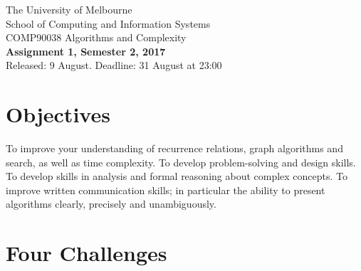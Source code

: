 \documentclass[11pt]{article}
\begin{document}
\begin{center}
{\sc The University of Melbourne
\\
School of Computing and Information Systems
\\ 
COMP90038 Algorithms and Complexity}
\bigskip \\
{\Large\bf Assignment 1, Semester 2, 2017}
\bigskip \\
{\large Released: 9 August.  Deadline: 31 August at 23:00}
\end{center}

\section*{Objectives}

To improve your understanding of recurrence relations, 
graph algorithms and search, as well as time complexity.
To develop problem-solving and design skills.
To develop skills in analysis and formal reasoning about
complex concepts.
To improve written communication skills; in particular the
ability to present algorithms clearly, precisely and unambiguously.

\section*{Four Challenges}
\end{document}
